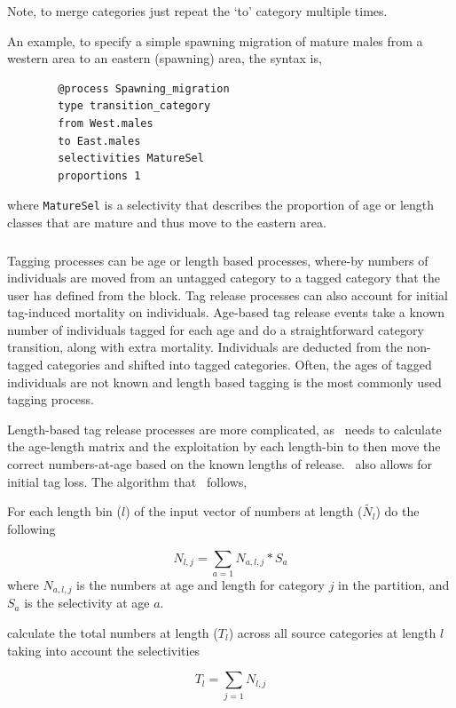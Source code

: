 Note, to merge categories just repeat the `to' category multiple times. 

An example, to specify a simple spawning migration of mature males from a western area to an eastern (spawning) area, the syntax is,
{\small{\begin{verbatim}
		@process Spawning_migration
		type transition_category
		from West.males	
		to East.males	
		selectivities MatureSel
		proportions 1
		\end{verbatim}}}

where \texttt{MatureSel} is a selectivity that describes the proportion of age or length classes that are mature and thus move to the eastern area.

\subsubsection{}\label{sub:tag_release}
Tagging processes can be age or length based processes, where-by numbers of individuals are moved from an untagged category to a tagged category that the user has defined from the  block. Tag release processes can also account for initial tag-induced mortality on individuals. Age-based tag release events take a known number of individuals tagged for each age and do a straightforward category transition, along with extra mortality. Individuals are deducted from the non-tagged categories and shifted into tagged categories. Often, the ages of tagged individuals are not known and length based tagging is the most commonly used tagging process.


Length-based tag release processes are more complicated, as \CNAME\ needs to calculate the age-length matrix and the exploitation by each length-bin to then move the correct numbers-at-age based on the known lengths of release. \CNAME\ also allows for initial tag loss. The algorithm that \CNAME\ follows,


For each length bin ($l$) of the input vector of numbers at length ($\tilde{N_l}$) do the following

$$N_{l,j} = \sum_{a = 1}N_{a,l,j} * S_a$$
where $N_{a,l,j}$ is the numbers at age and length for category $j$ in the partition, and $S_a$ is the selectivity at age $a$.


calculate the total numbers at length ($T_l$) across all source categories at length $l$ taking into account the selectivities 

$$T_l = \sum_{j = 1}N_{l,j}$$


